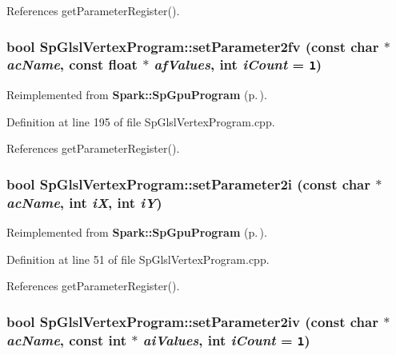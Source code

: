 References get\-Parameter\-Register().
\subsubsection{\setlength{\rightskip}{0pt plus 5cm}bool Sp\-Glsl\-Vertex\-Program::set\-Parameter2fv (const char $\ast$ {\em ac\-Name}, const float $\ast$ {\em af\-Values}, int {\em i\-Count} = {\tt 1})\hspace{0.3cm}{\tt  [virtual]}}\label{classSpark_1_1SpGlslVertexProgram_a14}




Reimplemented from {\bf Spark::Sp\-Gpu\-Program} {\rm (p.\,\pageref{classSpark_1_1SpGpuProgram_a25})}.

Definition at line 195 of file Sp\-Glsl\-Vertex\-Program.cpp.

References get\-Parameter\-Register().
\subsubsection{\setlength{\rightskip}{0pt plus 5cm}bool Sp\-Glsl\-Vertex\-Program::set\-Parameter2i (const char $\ast$ {\em ac\-Name}, int {\em i\-X}, int {\em i\-Y})\hspace{0.3cm}{\tt  [virtual]}}\label{classSpark_1_1SpGlslVertexProgram_a2}




Reimplemented from {\bf Spark::Sp\-Gpu\-Program} {\rm (p.\,\pageref{classSpark_1_1SpGpuProgram_a13})}.

Definition at line 51 of file Sp\-Glsl\-Vertex\-Program.cpp.

References get\-Parameter\-Register().
\subsubsection{\setlength{\rightskip}{0pt plus 5cm}bool Sp\-Glsl\-Vertex\-Program::set\-Parameter2iv (const char $\ast$ {\em ac\-Name}, const int $\ast$ {\em ai\-Values}, int {\em i\-Count} = {\tt 1})\hspace{0.3cm}{\tt  [virtual]}}\label{classSpark_1_1SpGlslVertexProgram_a6}


